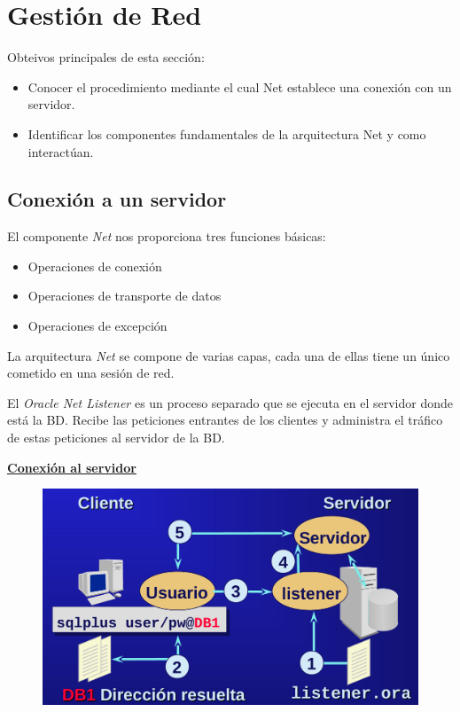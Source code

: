 \section{Gestión de Red}

Obteivos principales de esta sección:
\begin{itemize}
\item Conocer el procedimiento mediante el cual Net establece una conexión con un servidor.
\item Identificar los componentes fundamentales de la arquitectura Net y como interactúan.
\end{itemize}

\subsection{Conexión a un servidor}

El componente \textit{Net} nos proporciona tres funciones básicas:
\begin{itemize}
\item Operaciones de conexión
\item Operaciones de transporte de datos
\item Operaciones de excepción
\end{itemize}
La arquitectura \textit{Net} se compone de varias capas, cada una de ellas tiene un único cometido en una sesión de red.

El \textit{Oracle Net Listener} es un proceso separado que se ejecuta en el servidor donde está la BD. Recibe las peticiones entrantes de los clientes y administra el tráfico de estas peticiones al servidor de la BD. 

\underline{\textbf{Conexión al servidor}}

\begin{figure}[H]
  \center
  \includegraphics[scale=0.2]{img/p12.png}
\end{figure}

